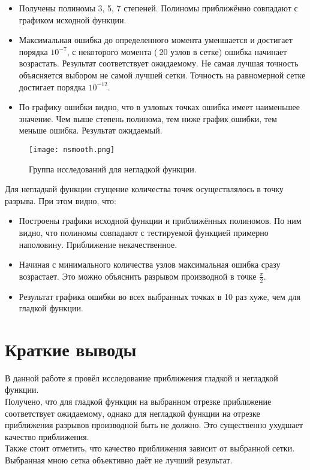 \documentclass[12pt]{article}
\begin{document}
\begin{itemize}
    \item Получены полиномы 3, 5, 7 степеней. Полиномы приближённо совпадают с графиком исходной функции.\\
    \item Максимальная ошибка до определенного момента уменшается и достигает порядка $10^{-7}$, с некоторого момента ($~20 $ узлов в сетке) ошибка начинает возрастать. Результат соответствует ожидаемому. Не самая лучшая точность объясняется выбором не самой лучшей сетки. Точность на равномерной сетке достигает порядка $10^{-12}$.
    \item По графику ошибки видно, что в узловых точках ошибка имеет наименьшее значение. Чем выше степень полинома, тем ниже график ошибки, тем меньше ошибка. Результат ожидаемый.
\end{itemize}
\begin{figure}[h!]
\center
\texttt{[image: nsmooth.png]}
\caption{Группа исследований для негладкой функции.}
\end{figure}
Для негладкой функции сгущение количества точек осуществлялось в точку разрыва. При этом видно, что:\\
\begin{itemize}
    \item Построены графики исходной функции и приближённых полиномов. По ним видно, что полиномы совпадают с тестируемой функцией примерно наполовину. Приближение некачественное.
    \item Начиная с минимального количества узлов максимальная ошибка сразу возрастает. Это можно объяснить разрывом производной в точке $\frac{\pi}{2}$.
    \item Результат графика ошибки во всех выбранных точках в 10 раз хуже, чем для гладкой функции.
\end{itemize}
\section{Краткие выводы}
В данной работе я провёл исследование приближения гладкой и негладкой функции.\\
Получено, что для гладкой функции на выбранном отрезке приближение соответствует ожидаемому, однако для негладкой функции на отрезке приближения разрывов производной быть не должно. Это существенно ухудшает качество приближения.\\
Также стоит отметить, что качество приближения зависит от выбранной сетки. Выбранная мною сетка объективно даёт не лучший результат.
\end{document}
